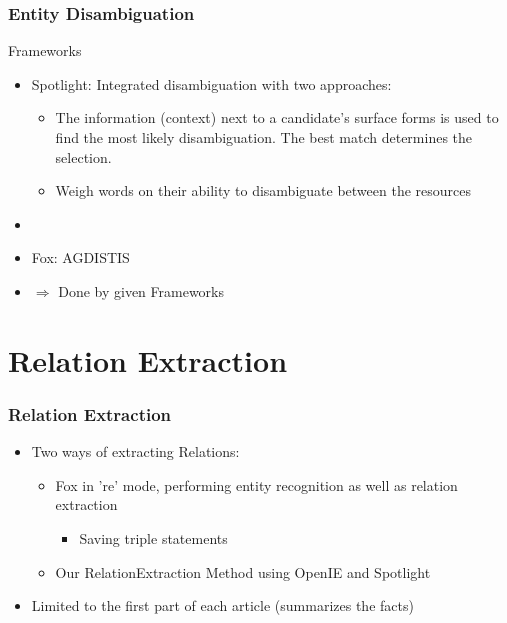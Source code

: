 \documentclass{beamer}
\begin{document}
\begin{frame}
\frametitle{Entity Disambiguation}
\begin{block}{Frameworks}
\begin{itemize}
	\item Spotlight: Integrated disambiguation with two approaches: 
	\begin{itemize}
		\item The information (context) next to a candidate's surface forms is used to find the most likely disambiguation. The best match determines the selection.
		\item Weigh words on their ability to disambiguate between the resources
	\end{itemize}
	\item[] \cite{p2}
	\item Fox: AGDISTIS
\end{itemize}
\end{block}
\begin{itemize}
	\item[] $\Rightarrow$ Done by given Frameworks
\end{itemize}

\end{frame}


\section{Relation Extraction}

\begin{frame}
\frametitle{Relation Extraction}
\begin{itemize}
	\item Two ways of extracting Relations:
	\begin{itemize}
		\item Fox in 're' mode, performing entity recognition as well as relation extraction
		\begin{itemize}
			\item Saving triple statements
		\end{itemize}
		\item Our RelationExtraction Method using OpenIE and Spotlight 
	\end{itemize}
	\item Limited to the first part of each article (summarizes the facts)
\end{itemize}
\end{frame}
\end{document}
